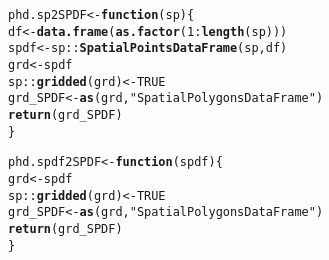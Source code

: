 \documentclass[a4paper,12pt,times,numbered,print,index]{Classes/PhDThesisPSnPDF}\usepackage[]{graphicx}\usepackage[]{color}
\makeatletter
\newcommand{\hlnum}[1]{\textcolor[rgb]{0.686,0.059,0.569}{#1}}%
\newcommand{\hlstr}[1]{\textcolor[rgb]{0.192,0.494,0.8}{#1}}%
\newcommand{\hlopt}[1]{\textcolor[rgb]{0,0,0}{#1}}%
\newcommand{\hlstd}[1]{\textcolor[rgb]{0.345,0.345,0.345}{#1}}%
\newcommand{\hlkwa}[1]{\textcolor[rgb]{0.161,0.373,0.58}{\textbf{#1}}}%
\newcommand{\hlkwb}[1]{\textcolor[rgb]{0.69,0.353,0.396}{#1}}%
\newcommand{\hlkwc}[1]{\textcolor[rgb]{0.333,0.667,0.333}{#1}}%
\newcommand{\hlkwd}[1]{\textcolor[rgb]{0.737,0.353,0.396}{\textbf{#1}}}%
\newenvironment{kframe}{%
 \def\at@end@of@kframe{}%
 \ifinner\ifhmode%
  \def\at@end@of@kframe{\end{minipage}}%
  \begin{minipage}{\columnwidth}%
 \fi\fi%
 \def\FrameCommand##1{\hskip\@totalleftmargin \hskip-\fboxsep
 \colorbox{shadecolor}{##1}\hskip-\fboxsep
     \hskip-\linewidth \hskip-\@totalleftmargin \hskip\columnwidth}%
 \MakeFramed {\advance\hsize-\width
   \@totalleftmargin\z@ \linewidth\hsize
   \@setminipage}}%
 {\par\unskip\endMakeFramed%
 \at@end@of@kframe}
\newenvironment{knitrout}{}{} %
\renewenvironment{knitrout}{\begin{singlespace}}{\end{singlespace}}
\makeatother
\begin{document}
\begin{appendices}
\begin{knitrout}
\begin{kframe}
\begin{alltt}
\hlstd{phd.sp2SPDF}  \hlkwb{<-} \hlkwa{function}\hlstd{(}\hlkwc{sp}\hlstd{) \{}
        \hlstd{df}  \hlkwb{<-} \hlkwd{data.frame}\hlstd{(}\hlkwd{as.factor}\hlstd{(}\hlnum{1}\hlopt{:}\hlkwd{length}\hlstd{(sp)))}
        \hlstd{spdf} \hlkwb{<-} \hlstd{sp::}\hlkwd{SpatialPointsDataFrame}\hlstd{(sp, df)}
        \hlstd{grd}  \hlkwb{<-} \hlstd{spdf}
        \hlstd{sp::}\hlkwd{gridded}\hlstd{(grd)}  \hlkwb{<-} \hlnum{TRUE}
        \hlstd{grd_SPDF}  \hlkwb{<-} \hlkwd{as}\hlstd{(grd,} \hlstr{"SpatialPolygonsDataFrame"}\hlstd{)}
        \hlkwd{return}\hlstd{(grd_SPDF)}
\hlstd{\}}

\hlstd{phd.spdf2SPDF}  \hlkwb{<-} \hlkwa{function}\hlstd{(}\hlkwc{spdf}\hlstd{) \{}
        \hlstd{grd}  \hlkwb{<-} \hlstd{spdf}
        \hlstd{sp::}\hlkwd{gridded}\hlstd{(grd)}  \hlkwb{<-} \hlnum{TRUE}
        \hlstd{grd_SPDF}  \hlkwb{<-} \hlkwd{as}\hlstd{(grd,} \hlstr{"SpatialPolygonsDataFrame"}\hlstd{)}
        \hlkwd{return}\hlstd{(grd_SPDF)}
\hlstd{\}}


\end{alltt}
\end{kframe}
\end{knitrout}
\end{appendices}
\end{document}
